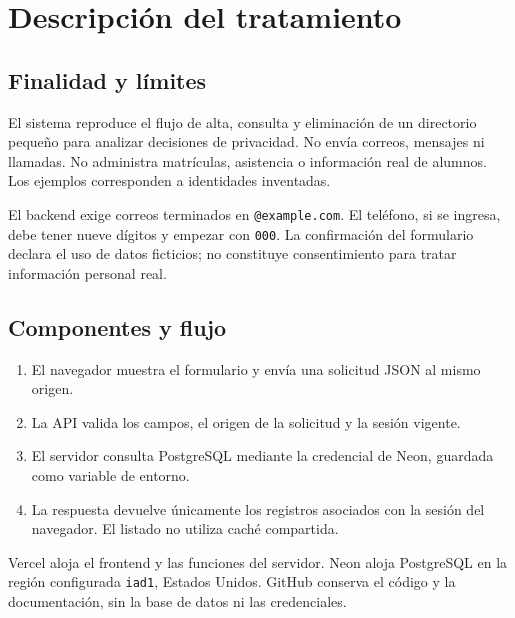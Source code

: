 \documentclass[11pt,a4paper]{article}
\begin{document}
\newpage
\section{Descripción del tratamiento}
\subsection{Finalidad y límites}
El sistema reproduce el flujo de alta, consulta y eliminación de un directorio pequeño para analizar decisiones de privacidad. No envía correos, mensajes ni llamadas. No administra matrículas, asistencia o información real de alumnos. Los ejemplos corresponden a identidades inventadas.

El backend exige correos terminados en \texttt{@example.com}. El teléfono, si se ingresa, debe tener nueve dígitos y empezar con \texttt{000}. La confirmación del formulario declara el uso de datos ficticios; no constituye consentimiento para tratar información personal real.

\subsection{Componentes y flujo}
\begin{enumerate}
\item El navegador muestra el formulario y envía una solicitud JSON al mismo origen.
\item La API valida los campos, el origen de la solicitud y la sesión vigente.
\item El servidor consulta PostgreSQL mediante la credencial de Neon, guardada como variable de entorno.
\item La respuesta devuelve únicamente los registros asociados con la sesión del navegador. El listado no utiliza caché compartida.
\end{enumerate}
Vercel aloja el frontend y las funciones del servidor. Neon aloja PostgreSQL en la región configurada \texttt{iad1}, Estados Unidos. GitHub conserva el código y la documentación, sin la base de datos ni las credenciales.
\end{document}
